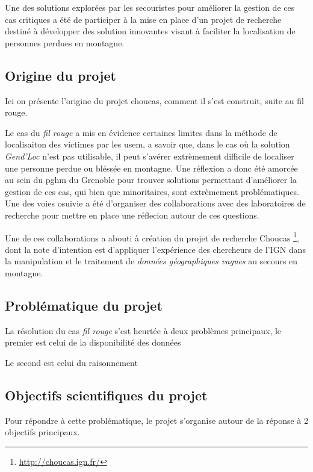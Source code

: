 Une des solutions explorées par les secouristes pour améliorer la
gestion de ces cas critiques a été de participer à la mise en place
d'un projet de recherche destiné à développer des solution innovantes
visant à faciliter la localisation de personnes perdues en montagne.


\subsection{Origine du projet}
\label{subsec:1-2-1}

Ici on présente l'origine du projet choucas, comment il s'est
construit, suite au fil rouge. 

Le cas du \emph{fil rouge} a mis en évidence certaines limites dans la
méthode de localisaiton des victimes par les \ac{usem}, a savoir que,
dans le cas où la solution \emph{Gend'Loc} n'est pas utilisable, il
peut s'avérer extrèmement difficile de localiser une personne perdue
ou bléssée en montagne. Une réflexion a donc été amorcée au sein du
\ac{pghm} du Grenoble pour trouver solutions permettant d'améliorer la
gestion de ces cas, qui bien que minoritaires, sont extrèmement
problématiques. Une des voies osuivie a été d'organiser des
collaborations avec des laboratoires de recherche pour mettre en place
une réflecion autour de ces questions.

Une de ces collaborations a abouti à création du projet de recherche
Choucas \footnote{\url{http://choucas.ign.fr/}}, dont la note
d'intention est d'appliquer l'expérience des chercheurs de l'IGN dans
la manipulation et le traitement de \emph{données géographiques
  vagues} au secours en montagne.


\subsection{Problématique du projet}
\label{subsec:1-2-2}

La résolution du cas \emph{fil rouge} s'est heurtée à deux problèmes
principaux, le premier est celui de la disponibilité des données

Le second est celui du raisonnement

\subsection{Objectifs scientifiques du projet}
\label{subsec:1-2-3}

Pour répondre à cette problématique, le projet s'organise autour de la
réponse à 2 objectifs principaux.

